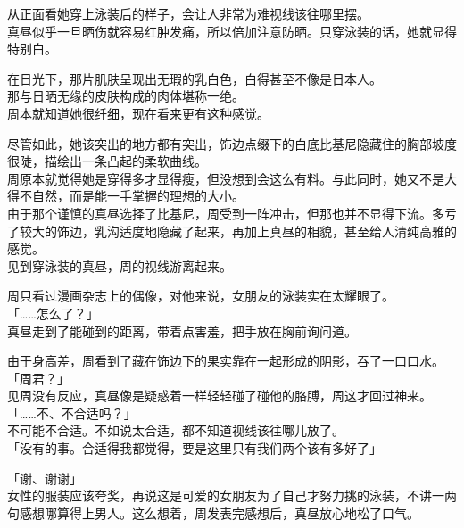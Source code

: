 从正面看她穿上泳装后的样子，会让人非常为难视线该往哪里摆。\\

真昼似乎一旦晒伤就容易红肿发痛，所以倍加注意防晒。只穿泳装的话，她就显得特别白。

在日光下，那片肌肤呈现出无瑕的乳白色，白得甚至不像是日本人。\\

那与日晒无缘的皮肤构成的肉体堪称一绝。\\

周本就知道她很纤细，现在看来更有这种感觉。

尽管如此，她该突出的地方都有突出，饰边点缀下的白底比基尼隐藏住的胸部坡度很陡，描绘出一条凸起的柔软曲线。\\

周原本就觉得她是穿得多才显得瘦，但没想到会这么有料。与此同时，她又不是大得不自然，而是能一手掌握的理想的大小。\\

由于那个谨慎的真昼选择了比基尼，周受到一阵冲击，但那也并不显得下流。多亏了较大的饰边，乳沟适度地隐藏了起来，再加上真昼的相貌，甚至给人清纯高雅的感觉。\\

见到穿泳装的真昼，周的视线游离起来。

周只看过漫画杂志上的偶像，对他来说，女朋友的泳装实在太耀眼了。\\

「……怎么了？」\\

真昼走到了能碰到的距离，带着点害羞，把手放在胸前询问道。

由于身高差，周看到了藏在饰边下的果实靠在一起形成的阴影，吞了一口口水。\\

「周君？」\\

见周没有反应，真昼像是疑惑着一样轻轻碰了碰他的胳膊，周这才回过神来。\\

「……不、不合适吗？」\\

不可能不合适。不如说太合适，都不知道视线该往哪儿放了。\\

「没有的事。合适得我都觉得，要是这里只有我们两个该有多好了」

「谢、谢谢」\\

女性的服装应该夸奖，再说这是可爱的女朋友为了自己才努力挑的泳装，不讲一两句感想哪算得上男人。这么想着，周发表完感想后，真昼放心地松了口气。\\


